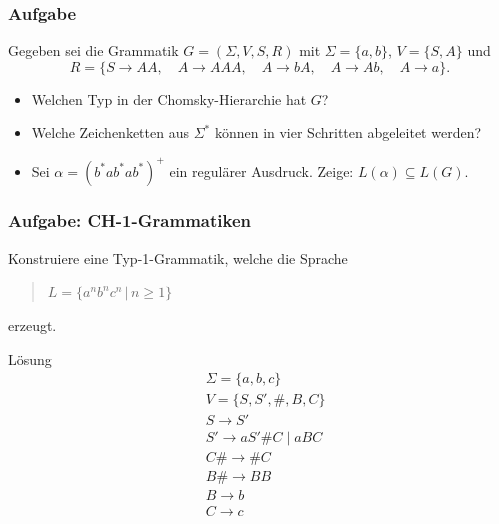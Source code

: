 
\begin{frame}
\frametitle{Aufgabe}
Gegeben sei die Grammatik $G = (\Sigma, V, S, R)$ mit $\Sigma = \{a, b\}$,
$V = \{S, A\}$ und 
\[ R = \{S \rightarrow AA, \quad A \rightarrow AAA,
\quad A \rightarrow bA, \quad A \rightarrow Ab, \quad A \rightarrow a\}. \]

\begin{itemize}
  \item Welchen Typ in der Chomsky-Hierarchie hat $G$?

  \item Welche Zeichenketten aus $\Sigma^*$ k\"onnen in vier Schritten abgeleitet werden?

  \item Sei $\alpha = (b^*ab^*ab^*)^+$ ein regul\"arer Ausdruck.
        Zeige: $L(\alpha) \subseteq L(G)$.
\end{itemize}
\end{frame}


\begin{frame}
\frametitle{Aufgabe: CH-1-Grammatiken}
Konstruiere eine Typ-1-Grammatik, welche die Sprache

\begin{quote}
  $L = \{a^n b^n c^n \, | \, n \geq 1\}$
\end{quote}

erzeugt.

\invincible
\pause
\begin{block}{Lösung}
\ducttape{-1cm}
\begin{align*}
&\Sigma = \{a, b, c\} \\
&V = \{ S, S', \#, B, C \} \\
&S \rightarrow S' \\
&S' \rightarrow aS'\#C \mid aBC \\
&C\# \rightarrow \#C \\
&B\# \rightarrow BB \\
&B \rightarrow b \\
&C \rightarrow c
\end{align*}
\end{block}
\vincible
\end{frame}

